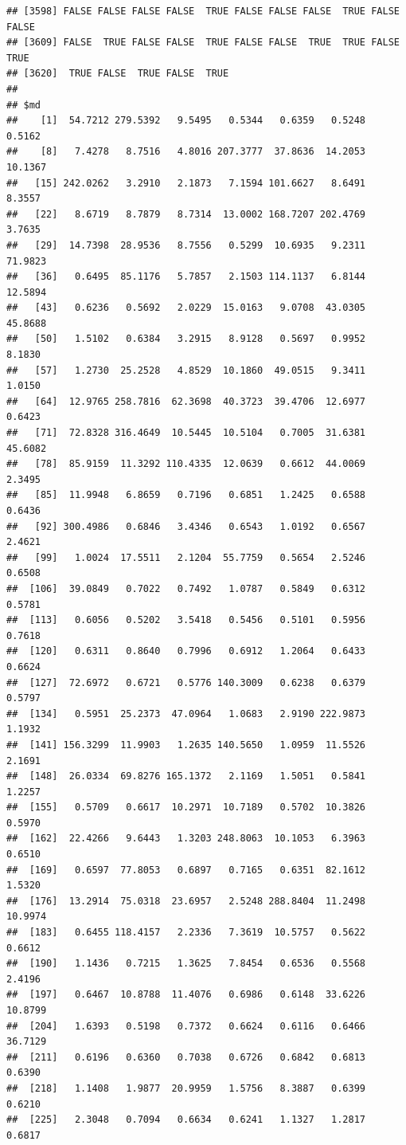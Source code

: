 \documentclass{article}\usepackage[]{graphicx}\usepackage[]{color}
\makeatletter
\newenvironment{kframe}{%
 \def\at@end@of@kframe{}%
 \ifinner\ifhmode%
  \def\at@end@of@kframe{\end{minipage}}%
  \begin{minipage}{\columnwidth}%
 \fi\fi%
 \def\FrameCommand##1{\hskip\@totalleftmargin \hskip-\fboxsep
 \colorbox{shadecolor}{##1}\hskip-\fboxsep
     \hskip-\linewidth \hskip-\@totalleftmargin \hskip\columnwidth}%
 \MakeFramed {\advance\hsize-\width
   \@totalleftmargin\z@ \linewidth\hsize
   \@setminipage}}%
 {\par\unskip\endMakeFramed%
 \at@end@of@kframe}
\newenvironment{knitrout}{}{} %
\makeatother
\begin{document}
\begin{knitrout}
\begin{kframe}
\begin{verbatim}
## [3598] FALSE FALSE FALSE FALSE  TRUE FALSE FALSE FALSE  TRUE FALSE FALSE
## [3609] FALSE  TRUE FALSE FALSE  TRUE FALSE FALSE  TRUE  TRUE FALSE  TRUE
## [3620]  TRUE FALSE  TRUE FALSE  TRUE
## 
## $md
##    [1]  54.7212 279.5392   9.5495   0.5344   0.6359   0.5248   0.5162
##    [8]   7.4278   8.7516   4.8016 207.3777  37.8636  14.2053  10.1367
##   [15] 242.0262   3.2910   2.1873   7.1594 101.6627   8.6491   8.3557
##   [22]   8.6719   8.7879   8.7314  13.0002 168.7207 202.4769   3.7635
##   [29]  14.7398  28.9536   8.7556   0.5299  10.6935   9.2311  71.9823
##   [36]   0.6495  85.1176   5.7857   2.1503 114.1137   6.8144  12.5894
##   [43]   0.6236   0.5692   2.0229  15.0163   9.0708  43.0305  45.8688
##   [50]   1.5102   0.6384   3.2915   8.9128   0.5697   0.9952   8.1830
##   [57]   1.2730  25.2528   4.8529  10.1860  49.0515   9.3411   1.0150
##   [64]  12.9765 258.7816  62.3698  40.3723  39.4706  12.6977   0.6423
##   [71]  72.8328 316.4649  10.5445  10.5104   0.7005  31.6381  45.6082
##   [78]  85.9159  11.3292 110.4335  12.0639   0.6612  44.0069   2.3495
##   [85]  11.9948   6.8659   0.7196   0.6851   1.2425   0.6588   0.6436
##   [92] 300.4986   0.6846   3.4346   0.6543   1.0192   0.6567   2.4621
##   [99]   1.0024  17.5511   2.1204  55.7759   0.5654   2.5246   0.6508
##  [106]  39.0849   0.7022   0.7492   1.0787   0.5849   0.6312   0.5781
##  [113]   0.6056   0.5202   3.5418   0.5456   0.5101   0.5956   0.7618
##  [120]   0.6311   0.8640   0.7996   0.6912   1.2064   0.6433   0.6624
##  [127]  72.6972   0.6721   0.5776 140.3009   0.6238   0.6379   0.5797
##  [134]   0.5951  25.2373  47.0964   1.0683   2.9190 222.9873   1.1932
##  [141] 156.3299  11.9903   1.2635 140.5650   1.0959  11.5526   2.1691
##  [148]  26.0334  69.8276 165.1372   2.1169   1.5051   0.5841   1.2257
##  [155]   0.5709   0.6617  10.2971  10.7189   0.5702  10.3826   0.5970
##  [162]  22.4266   9.6443   1.3203 248.8063  10.1053   6.3963   0.6510
##  [169]   0.6597  77.8053   0.6897   0.7165   0.6351  82.1612   1.5320
##  [176]  13.2914  75.0318  23.6957   2.5248 288.8404  11.2498  10.9974
##  [183]   0.6455 118.4157   2.2336   7.3619  10.5757   0.5622   0.6612
##  [190]   1.1436   0.7215   1.3625   7.8454   0.6536   0.5568   2.4196
##  [197]   0.6467  10.8788  11.4076   0.6986   0.6148  33.6226  10.8799
##  [204]   1.6393   0.5198   0.7372   0.6624   0.6116   0.6466  36.7129
##  [211]   0.6196   0.6360   0.7038   0.6726   0.6842   0.6813   0.6390
##  [218]   1.1408   1.9877  20.9959   1.5756   8.3887   0.6399   0.6210
##  [225]   2.3048   0.7094   0.6634   0.6241   1.1327   1.2817   0.6817

\end{verbatim}
\end{kframe}
\end{knitrout}
\end{document}
